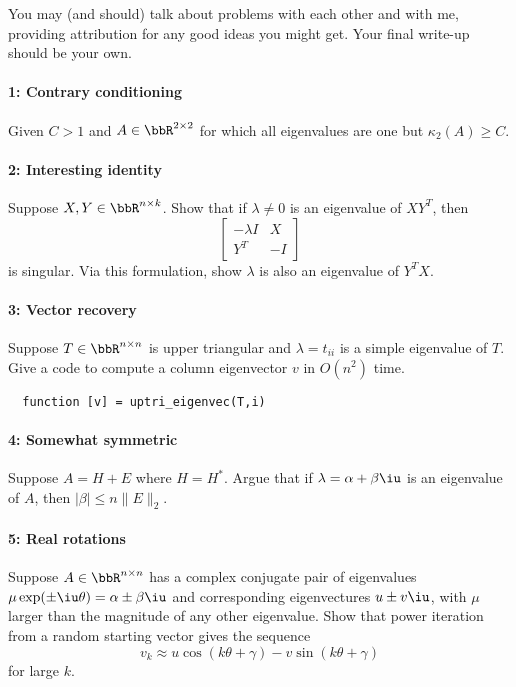 \documentclass[12pt, leqno]{article} %
\begin{document}

You may (and should) talk about problems with each other and with me,
providing attribution for any good ideas you might get.  Your final
write-up should be your own.

\paragraph*{1: Contrary conditioning}
Given $C > 1$ and $A \in \bbR^{2 \times 2}$ for which all
eigenvalues are one but $\kappa_2(A) \geq C$.

\paragraph*{2: Interesting identity}
Suppose $X, Y \in \bbR^{n \times k}$.  Show that if $\lambda \neq 0$
is an eigenvalue of $XY^T$, then
\[
  \begin{bmatrix}
    -\lambda I & X \\
    Y^T & -I
  \end{bmatrix}
\]
is singular.  Via this formulation, show $\lambda$ is also an
eigenvalue of $Y^T X$.

\paragraph*{3: Vector recovery}
Suppose $T \in \bbR^{n \times n}$ is upper triangular and
$\lambda = t_{ii}$ is a simple eigenvalue of $T$.  Give a code
to compute a column eigenvector $v$ in $O(n^2)$ time.
\begin{lstlisting}
  function [v] = uptri_eigenvec(T,i)
\end{lstlisting}

\paragraph*{4: Somewhat symmetric}
Suppose $A = H + E$ where $H=H^*$.  Argue that if
$\lambda = \alpha+\beta \iu$ is an eigenvalue of $A$,
then $|\beta| \leq n \|E\|_2$.

\paragraph*{5: Real rotations}
Suppose $A \in \bbR^{n \times n}$ has a complex conjugate pair
of eigenvalues $\mu \exp(\pm \iu \theta) = \alpha \pm \beta \iu$
and corresponding eigenvectures $u \pm v\iu$,
with $\mu$ larger than the magnitude of any other eigenvalue.
Show that power iteration from a random starting vector gives the sequence
\[
  v_k \approx u \cos(k\theta + \gamma) - v \sin(k\theta + \gamma)
\]
for large $k$.
\end{document}
